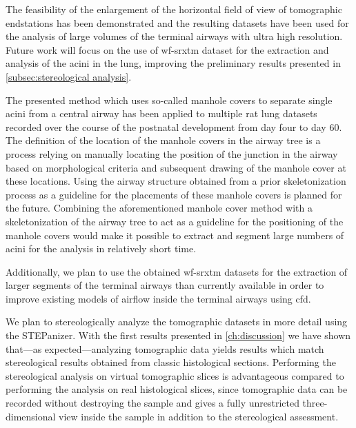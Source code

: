 The feasibility of the enlargement of the horizontal field of view of tomographic endstations has been demonstrated and the resulting datasets have been used for the analysis of large volumes of the terminal airways with ultra high resolution. Future work will focus on the use of \ac{wf-srxtm} dataset for the extraction and analysis of the acini in the lung, improving the preliminary results presented in \autoref{subsec:stereological analysis}.

The presented method which uses so-called manhole covers to separate single acini from a central airway has been applied to multiple rat lung datasets recorded over the course of the postnatal development from day four to day 60. The definition of the location of the manhole covers in the airway tree is a process relying on manually locating the position of the junction in the airway based on morphological criteria and subsequent drawing of the manhole cover at these locations. Using the airway structure obtained from a prior skeletonization process as a guideline for the placements of these manhole covers is planned for the future. Combining the aforementioned manhole cover method with a skeletonization of the airway tree to act as a guideline for the positioning of the manhole covers would make it possible to extract and segment large numbers of acini for the analysis in relatively short time.

Additionally, we plan to use the obtained \ac{wf-srxtm} datasets for the extraction of larger segments of the terminal airways than currently available in order to improve existing models of airflow inside the terminal airways using \ac{cfd}. 

We plan to stereologically analyze the tomographic datasets in more detail using the STEPanizer. With the first results presented in \autoref{ch:discussion} we have shown that---as expected---analyzing tomographic data yields results which match stereological results obtained from classic histological sections. Performing the stereological analysis on virtual tomographic slices is advantageous compared to performing the analysis on real histological slices, since tomographic data can be recorded without destroying the sample and gives a fully unrestricted three-dimensional view inside the sample in addition to the stereological assessment.


